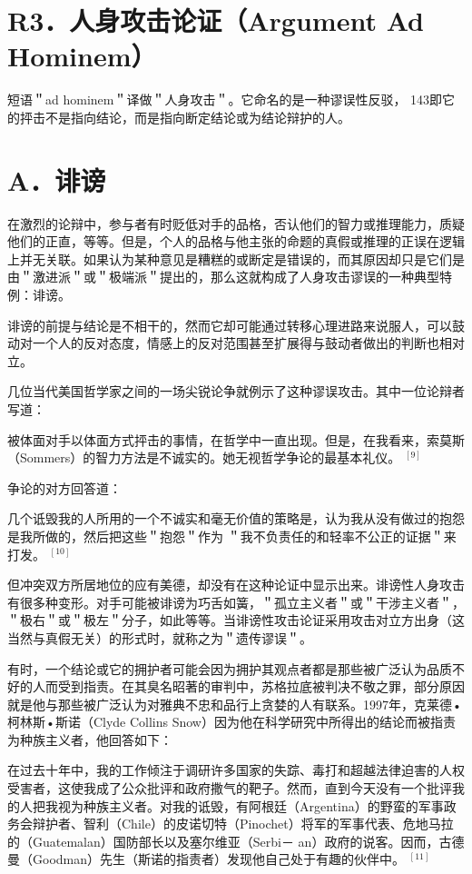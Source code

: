 \section*{R3．人身攻击论证（Argument Ad Hominem）}
短语＂ad hominem＂译做＂人身攻击＂。它命名的是一种谬误性反驳， 143即它的抨击不是指向结论，而是指向断定结论或为结论辩护的人。

\section*{A．诽谤}
在激烈的论辩中，参与者有时贬低对手的品格，否认他们的智力或推理能力，质疑他们的正直，等等。但是，个人的品格与他主张的命题的真假或推理的正误在逻辑上并无关联。如果认为某种意见是糟糕的或断定是错误的，而其原因却只是它们是由＂激进派＂或＂极端派＂提出的，那么这就构成了人身攻击谬误的一种典型特例：诽谤。

诽谤的前提与结论是不相干的，然而它却可能通过转移心理进路来说服人，可以鼓动对一个人的反对态度，情感上的反对范围甚至扩展得与鼓动者做出的判断也相对立。

几位当代美国哲学家之间的一场尖锐论争就例示了这种谬误攻击。其中一位论辩者写道：

被体面对手以体面方式抨击的事情，在哲学中一直出现。但是，在我看来，索莫斯（Sommers）的智力方法是不诚实的。她无视哲学争论的最基本礼仪。 ${ }^{[9]}$

争论的对方回答道：

几个诋毁我的人所用的一个不诚实和毫无价值的策略是，认为我从没有做过的抱怨是我所做的，然后把这些＂抱怨＂作为 ＂我不负责任的和轻率不公正的证据＂来打发。 ${ }^{[10]}$

但冲突双方所居地位的应有美德，却没有在这种论证中显示出来。诽谤性人身攻击有很多种变形。对手可能被诽谤为巧舌如簧，＂孤立主义者＂或＂干涉主义者＂，＂极右＂或＂极左＂分子，如此等等。当诽谤性攻击论证采用攻击对立方出身（这当然与真假无关）的形式时，就称之为＂遗传谬误＂。

有时，一个结论或它的拥护者可能会因为拥护其观点者都是那些被广泛认为品质不好的人而受到指责。在其臭名昭著的审判中，苏格拉底被判决不敬之罪，部分原因就是他与那些被广泛认为对雅典不忠和品行上贪婪的人有联系。1997年，克莱德•柯林斯•斯诺（Clyde Collins Snow）因为他在科学研究中所得出的结论而被指责为种族主义者，他回答如下：

\begin{displayquote}
在过去十年中，我的工作倾注于调研许多国家的失踪、毒打和超越法律迫害的人权受害者，这使我成了公众批评和政府撒气的靶子。然而，直到今天没有一个批评我的人把我视为种族主义者。对我的诋毁，有阿根廷（Argentina）的野蛮的军事政务会辩护者、智利（Chile）的皮诺切特（Pinochet）将军的军事代表、危地马拉的（Guatemalan）国防部长以及塞尔维亚（Serbi－ an）政府的说客。因而，古德曼（Goodman）先生（斯诺的指责者）发现他自己处于有趣的伙伴中。 ${ }^{[11]}$
\end{displayquote}

